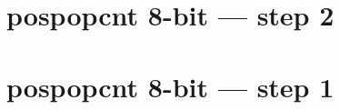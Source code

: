 \documentclass{article}
\begin{document}
\section{pospopcnt 8-bit --- step 2}


\section{pospopcnt 8-bit --- step 1}

\end{document}
